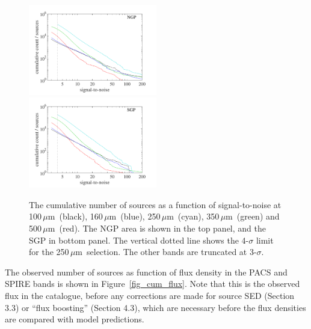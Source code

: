 \documentclass[a4paper,fleqn,usenatbib, twocolumn]{aastex61}
\def\mic{\,$\mu $m}
\begin{document}
\begin{figure}
  \includegraphics[width=0.5\textwidth]{cum_sn_best_NGP.pdf}
\includegraphics[width=0.5\textwidth]{cum_sn_best_SGP.pdf}
 \caption{\protect\label{fig_sn} The cumulative number of sources as a function
   of signal-to-noise at 100\mic\ (black), 160\mic\ (blue), 250\mic\ (cyan),
  350\mic\ (green) and 500\mic\ (red). The NGP area is shown in the top panel,
  and the SGP in bottom panel. The vertical dotted line shows the
  4-$\sigma$ limit for the 250\mic\ selection. The other bands are
  truncated at 3-$\sigma$.  
} 
\end{figure}


The observed number of sources as function of flux density in the PACS and
SPIRE bands is shown in Figure~\ref{fig_cum_flux}.  Note that this is
the observed flux in the catalogue, before any corrections are made
for source SED (Section 3.3) or ``flux boosting'' (Section 4.3), which
are necessary before the flux densities are compared with model
predictions. 
\end{document}
